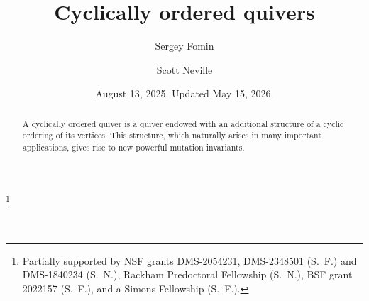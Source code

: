 \documentclass[11pt, letterpaper]{amsart}
\title{Cyclically ordered quivers}
\theoremstyle{definition}
\numberwithin{equation}{section}
\begin{document}
\author{Sergey Fomin}
\address{\hspace{-.3in} Department of Mathematics, University of Michigan,
Ann Arbor, MI 48109, USA}
\author{Scott Neville}


\date{August 13, 2025. Updated May 15, 2026.}

\thanks{Partially supported by NSF grants DMS-2054231, DMS-2348501 (S.~F.) and DMS-1840234 (S.~N.),
Rackham Predoctoral Fellowship (S.~N.), BSF grant 2022157 (S.~F.), and a Simons Fellowship (S.~F.).
}



\begin{abstract}
A cyclically ordered quiver is a quiver endowed with an additional structure of a cyclic ordering of its vertices. 
This structure, which naturally arises in many important applications, 
gives rise to new powerful mutation invariants. 
\end{abstract}

\ \vspace{-10pt}

\maketitle


\thispagestyle{empty}
\end{document}
